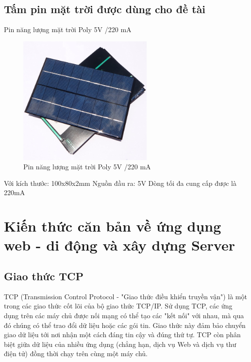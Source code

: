 \subsection*{Tấm pin mặt trời được dùng cho đề tài}

Pin năng lượng mặt trời Poly 5V /220 mA

\begin{center}
\begin{figure}[htp]
\centering    
\includegraphics[width=0.6\textwidth]{solarpanel_real}
\caption[Pin năng lượng mặt trời Poly 5V /220 mA]{Pin năng lượng mặt trời Poly 5V /220 mA}
\label{fig:solarpanel_real}
\end{figure}
\end{center}


Với kích thước: 100x80x2mm
Nguồn đầu ra: 5V
Dòng tối đa cung cấp được là 220mA





\section{Kiến thức căn bản về ứng dụng web - di động và xây dựng Server}

\subsection{Giao thức TCP}
TCP (Transmission Control Protocol - "Giao thức điều khiển truyền vận") là một trong các giao thức cốt lõi của bộ giao thức TCP/IP. Sử dụng TCP, các ứng dụng trên các máy chủ được nối mạng có thể tạo các "kết nối" với nhau, mà qua đó chúng có thể trao đổi dữ liệu hoặc các gói tin. Giao thức này đảm bảo chuyển giao dữ liệu tới nơi nhận một cách đáng tin cậy và đúng thứ tự. TCP còn phân biệt giữa dữ liệu của nhiều ứng dụng (chẳng hạn, dịch vụ Web và dịch vụ thư điện tử) đồng thời chạy trên cùng một máy chủ.

